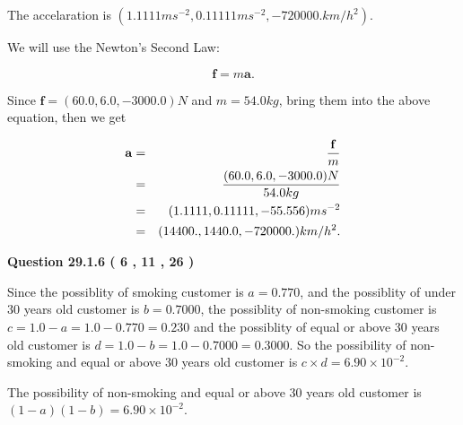 \documentclass[12pt]{article}
\begin{document}
  
 
 
\noindent{}
 
 
The accelaration is
$(
1.1111ms^{-2},
0.11111ms^{-2},
-720000.km/h^2
).
$
 
 
 
 
 
 
\noindent{}

We will use the Newton's Second Law:
 
\[
\mathbf{f}=m\mathbf{a}.
\]
 
Since $\mathbf{f}=( %
60.0,  %
6.0,  %
-3000.0 )N$
and $m= %
54.0kg$, bring them into the above equation, then we get
 
\begin{eqnarray*}
\mathbf{a}&=&\frac{\mathbf{f}}m  \\
&=&\frac{(
60.0 ,
6.0 ,
-3000.0 )N
}{ %
54.0 kg}  \\
&=&(
1.1111 ,
0.11111,
-55.556
)ms^{-2} \\
&=&(
14400. ,
1440.0 ,
-720000.
)km/h^2.
\end{eqnarray*}
 
 
 
  
\vspace{0.2in}
  
{\textbf{\Large{Question
29.1.6 
 (           6 ,          11 ,          26 )
}}}
  
  
 
 
\noindent{}

Since the possiblity of  %
smoking customer is $ a =  %
0.770 $,
and the possiblity of  %
 under 30 years old customer is $ b =  %
0.7000 $,
the possiblity of  %
non-smoking customer is $ c = 1.0 - a = 1.0 -
0.770
=  %
0.230 $ and the possiblity of  %
equal or above 30 years old
customer is $ d = 1.0 - b = 1.0 -  %
0.7000 =  %
0.3000  $.
So the possibility of  %
 non-smoking and  %
equal or above 30 years old
customer is $ c \times d =  %
6.90 \times 10^{-2} $.
 
 
 
 
 
\noindent{}

The possibility of  %
 non-smoking and  %
equal or above 30 years old
customer is $ (1-a)(1-b) =  %
6.90 \times 10^{-2} $.
 
\end{document}
